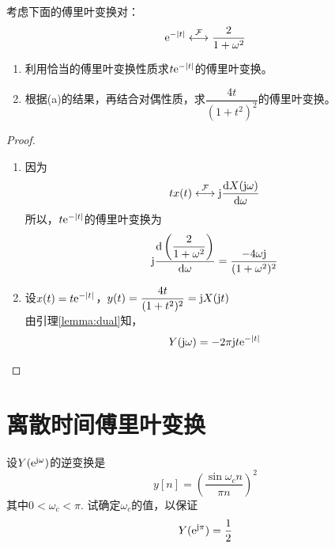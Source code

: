 \begin{proposition}

    考虑下面的傅里叶变换对：
    $$\mathrm{e}^{-|t|} \stackrel{\mathcal{F}}{\longleftrightarrow} \dfrac{2}{1 + \omega^2}$$

    \begin{enumerate}

        \item 利用恰当的傅里叶变换性质求$t\mathrm{e}^{-|t|}$的傅里叶变换。
        \item 根据\textup{(a)}的结果，再结合对偶性质，求$\dfrac{4t}{(1+t^2)^2}$的傅里叶变换。

    \end{enumerate}

\end{proposition}

\begin{proof}

    \begin{enumerate}

        \item 
            因为
            $$tx(t) \stackrel{\mathcal{F}}{\longleftrightarrow} \mathrm{j} \dfrac{\mathrm{d} X(\mathrm{j} \omega)}{\mathrm{d} \omega}$$
            所以，$t\mathrm{e}^{-|t|}$的傅里叶变换为
            $$\mathrm{j} \dfrac{\mathrm{d} \left( \dfrac{2}{1 + \omega^2} \right)}{\mathrm{d} \omega} = \dfrac{-4\omega \mathrm{j}}{(1 + \omega^2)^2}$$
        \item 
            设$x(t) = t\mathrm{e}^{-|t|}$，$y(t) = \dfrac{4t}{(1+t^2)^2} = \mathrm{j} X(\mathrm{j} t)$\\
            由引理\ref{lemma:dual}知，
            $$Y(\mathrm{j} \omega) = -2 \pi \mathrm{j} t \mathrm{e}^{-|t|}$$

    \end{enumerate}

\end{proof}

\section{离散时间傅里叶变换}

\begin{proposition}
    
    设$Y(\mathrm{e}^{\mathrm{j} \omega})$的逆变换是
    $$y[n] = \left(\dfrac{\sin{\omega_c n}}{\pi n}\right)^2$$
    其中$0 < \omega_c < \pi$. 试确定$\omega_c$的值，以保证
    $$Y(\mathrm{e}^{\mathrm{j} \pi}) = \dfrac{1}{2}$$

\end{proposition}

